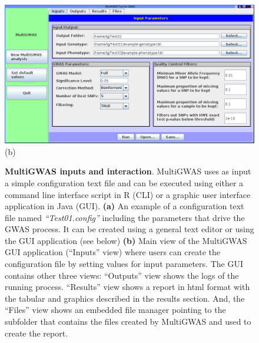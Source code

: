 \documentclass{article}
\begin{document}
\begin{figure}[H]
~
\begin{centering}
\noindent\begin{minipage}[t]{1\columnwidth}%
\begin{center}
 \includegraphics[scale=0.38]{images/screenshot-jmultiGWAS-inputsView}\\
(b)
\par\end{center}%
\end{minipage}
\par\end{centering}
\caption{\scriptsize\textbf{MultiGWAS inputs and interaction}. MultiGWAS uses as input a simple configuration text file and can be executed using either a command line interface script in R (CLI) or a graphic user interface application in Java (GUI). \textbf{(a) }An example of a configuration text file named \emph{``Test01.config'' }including the parameters that drive the GWAS process. It can be created using a general text editor or using the GUI application (see below) \textbf{(b) }Main view of the MultiGWAS GUI application (``Inputs'' view) where users can create the configuration file by setting values for input parameters. The GUI contains other three views: ``Outputs'' view shows the logs of the running process. ``Results'' view shows a report in html format with the tabular and graphics described in the results section. And, the ``Files'' view shows an embedded file manager pointing to the subfolder that contains the files created by MultiGWAS and used to create the report. \protect \\
\label{fig:MultiGWAS-interaction}}
\end{figure}
\end{document}
